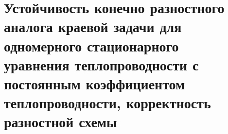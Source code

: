 \documentclass[__main__.tex]{subfiles}
\begin{document}
\section{Устойчивость конечно разностного аналога краевой задачи для одномерного стационарного уравнения теплопроводности с постоянным коэффициентом теплопроводности, корректность разностной схемы}
\end{document}
